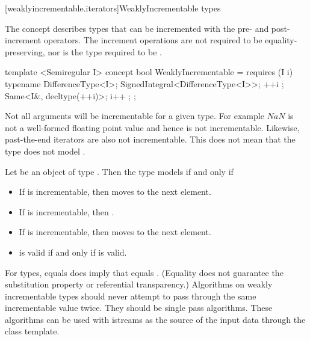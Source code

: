 \begin{addedblock}
[weaklyincrementable.iterators]{WeaklyIncrementable types}

The  concept describes types that can be incremented with the pre-
and post-increment operators. The increment operations are not required to be equality-preserving,
nor is the type required to be .

%
\begin{codeblock}
  template <Semiregular I>
  concept bool WeaklyIncrementable =
    requires (I i) {
      typename DifferenceType<I>;
      SignedIntegral<DifferenceType<I>>;
      { ++i };
      Same<I&, decltype(++i)>;
      { i++ };
    };
\end{codeblock}

\pnum
Not all arguments will be incrementable for a given type. For example $NaN$ is not a well-formed
floating point value and hence is not incrementable. Likewise, past-the-end iterators are also not
incrementable. This does not mean that the type does not model .

\pnum
Let  be an object of type .
Then the type  models  if and only if

\begin{itemize}
\item If  is incrementable, then  moves  to the next element.
\item If  is incrementable, then .
\item If  is incrementable, then  moves  to the next element.
\item {} is valid if and only if  is valid.
\end{itemize}


\pnum
\enternote For  types,  equals  does imply that 
equals . (Equality does not guarantee the substitution property or referential
transparency.) Algorithms on weakly incrementable types should never attempt to pass
through the same incrementable value twice. They should be single pass algorithms. These algorithms
can be used with istreams as the source of the input data through the  class
template.\exitnote


\end{addedblock}
